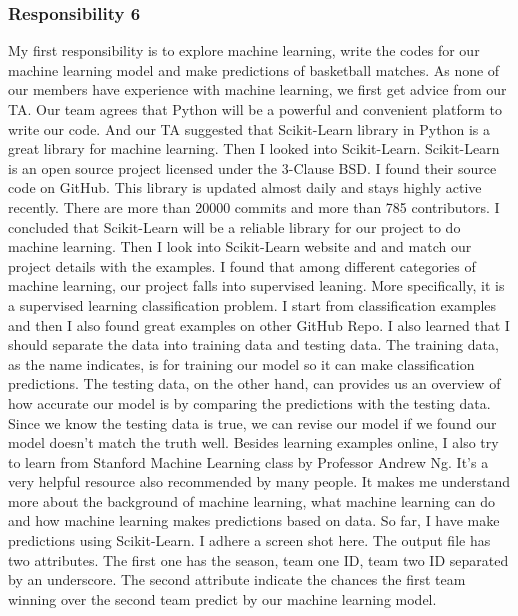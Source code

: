\documentclass[letterpaper, 10pt,titlepage]{article}
\begin{document}
\subsubsection{Responsibility 6}
\par My first responsibility is to explore machine learning, write the codes for our machine learning model and make predictions of basketball matches. As none of our members have experience with machine learning, we first get advice from our TA. Our team agrees that Python will be a powerful and convenient platform to write our code. And our TA suggested that Scikit-Learn library in Python is a great library for machine learning. Then I looked into Scikit-Learn. Scikit-Learn is an open source project licensed under the 3-Clause BSD. I found their source code on GitHub. This library is updated almost daily and stays highly active recently. There are more than 20000 commits and more than 785 contributors. I concluded that Scikit-Learn will be a reliable library for our project to do machine learning. Then I look into Scikit-Learn website and and match our project details with the examples. I found that among different categories of machine learning, our project falls into supervised leaning. More specifically, it is a supervised learning classification problem. I start from classification examples and then I also found great examples on other GitHub Repo. I also learned that I should separate the data into training data and testing data. The training data, as the name indicates, is for training our model so it can make classification predictions. The testing data, on the other hand, can provides us an overview of how accurate our model is by comparing the predictions with the testing data. Since we know the testing data is true, we can revise our model if we found our model doesn't match the truth well. Besides learning examples online, I also try to learn from Stanford Machine Learning class by Professor Andrew Ng. It's a very helpful resource also recommended by many people. It makes me understand more about the background of machine learning, what machine learning can do and how machine learning makes predictions based on data. So far, I have make predictions using Scikit-Learn. I adhere a screen shot here. The output file has two attributes. The first one has the season, team one ID, team two ID separated by an underscore. The second attribute indicate the chances the first team winning over the second team predict by our machine learning model. 
\end{document}
